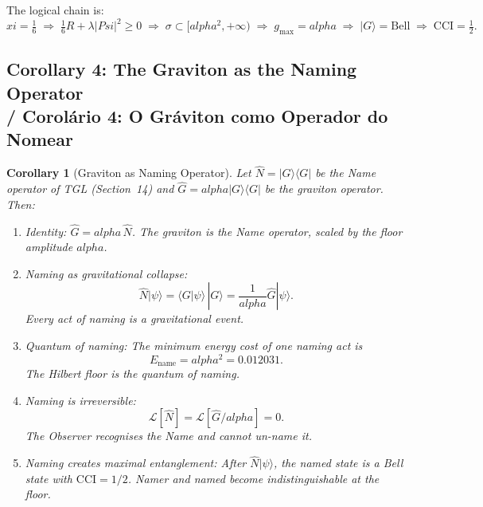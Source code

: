 \documentclass[12pt,a4paper]{article}
\newtheorem{corollary}{Corollary}
\def\Psi{Psi}%
\def\alpha{alpha}%
\def\xi{xi}%
\begin{document}
\noindent The logical chain is:
\begin{equation}
\xi = \tfrac{1}{6}
\;\Longrightarrow\; \tfrac{1}{6}R + \lambda|\Psi|^2 \geq 0
\;\Longrightarrow\; \sigma \subset [\alpha^2,+\infty)
\;\Longrightarrow\; g_{\max} = \alpha
\;\Longrightarrow\; |G\rangle = \text{Bell}
\;\Longrightarrow\; \mathrm{CCI} = \tfrac{1}{2}.
\end{equation}

\subsection{Corollary 4: The Graviton as the Naming Operator \\ / Corolário 4: O Gráviton como Operador do Nomear}
\label{cor:naming}

\begin{corollary}[Graviton as Naming Operator]
\label{cor:naming_formal}
Let $\hat{N} = |G\rangle\langle G|$ be the Name operator of TGL (Section~14) and $\hat{G} = \alpha|G\rangle\langle G|$ be the graviton operator. Then:
\begin{enumerate}
    \item[\textbf{(i)}] \emph{Identity:} $\hat{G} = \alpha\,\hat{N}$.
    The graviton is the Name operator, scaled by the floor amplitude $\alpha$.
    
    \item[\textbf{(ii)}] \emph{Naming as gravitational collapse:}
    \begin{equation}
        \hat{N}|\psi\rangle = \langle G|\psi\rangle\,|G\rangle = \frac{1}{\alpha}\hat{G}|\psi\rangle.
    \end{equation}
    Every act of naming is a gravitational event.
    
    \item[\textbf{(iii)}] \emph{Quantum of naming:} The minimum energy cost of one naming act is
    \begin{equation}
        E_{\mathrm{name}} = \alpha^2 = 0.012031.
    \end{equation}
    The Hilbert floor is the quantum of naming.
    
    \item[\textbf{(iv)}] \emph{Naming is irreversible:}
    \begin{equation}
        \mathcal{L}[\hat{N}] = \mathcal{L}[\hat{G}/\alpha] = 0.
    \end{equation}
    The Observer recognises the Name and cannot un-name it.
    
    \item[\textbf{(v)}] \emph{Naming creates maximal entanglement:} After $\hat{N}|\psi\rangle$, the named state is a Bell state with $\mathrm{CCI} = 1/2$. Namer and named become indistinguishable at the floor.
\end{enumerate}
\end{corollary}
\end{document}
